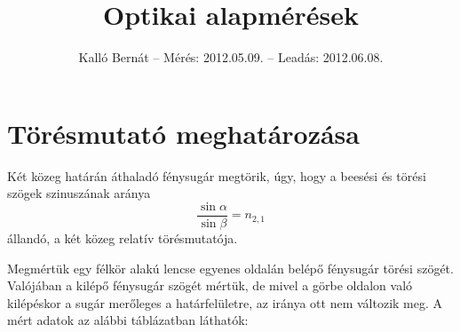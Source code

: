 \documentclass[12pt]{article}
\title{Optikai alapmérések}
\author{Kalló Bernát -- Mérés: 2012.05.09. -- Leadás: 2012.06.08.}
\date{}
\begin{document}
\def\t1{\ensuremath{t_1}}\def\t2{\ensuremath{t_2}}\def\k1{\ensuremath{k_1}}\def\k2{\ensuremath{k_2}}\def\t11{\ensuremath{\nicefrac{1}{t_1}}}\def\t21{\ensuremath{\nicefrac{1}{t_2}}}\def\k11{\ensuremath{\nicefrac{1}{k_1}}}\def\k21{\ensuremath{\nicefrac{1}{k_2}}}\def\tx1{\ensuremath{\nicefrac{1}{t}}}\def\kx1{\ensuremath{\nicefrac{1}{k}}}\def\dmin1{\ensuremath{d_{min,1}}}\def\dmin2{\ensuremath{d_{min,2}}}\def\y1{\ensuremath{y_{1}}}\def\y2{\ensuremath{y_{2}}}\def\a1{\ensuremath{a_{1}}}\def\a2{\ensuremath{a_{2}}}\def\deltaa1{\ensuremath{\delta{}a_{1}}}\def\deltaa2{\ensuremath{\delta{}a_{2}}}

\maketitle

\section{Törésmutató meghatározása}

Két közeg határán áthaladó fénysugár megtörik, úgy, hogy a beesési és törési szögek szinuszának aránya \[\frac{\sin\alpha}{\sin\beta} = n_{2,1}\] állandó, a két közeg relatív törésmutatója.

Megmértük egy félkör alakú lencse egyenes oldalán belépő fénysugár törési szögét. Valójában a kilépő fénysugár szögét mértük, de mivel a görbe oldalon való kilépéskor a sugár merőleges a határfelületre, az iránya ott nem változik meg. A mért adatok az alábbi táblázatban láthatók:
\end{document}
